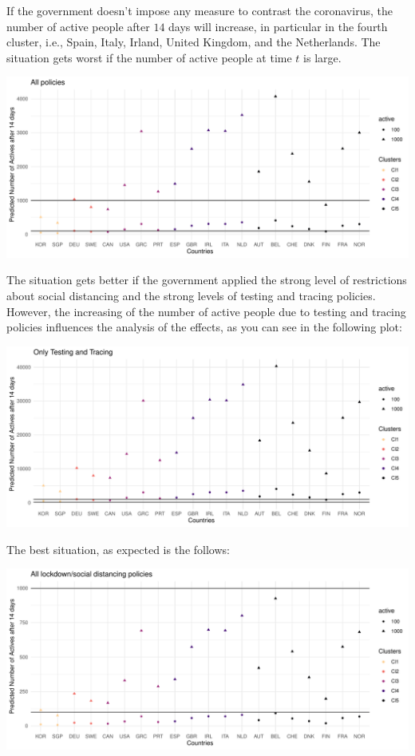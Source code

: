 \documentclass[
  6pt,
]{article}
\begin{document}
If the government doesn't impose any measure to contrast the
coronavirus, the number of active people after \(14\) days will
increase, in particular in the fourth cluster, i.e., Spain, Italy,
Irland, United Kingdom, and the Netherlands. The situation gets worst if
the number of active people at time \(t\) is large.

\begin{center}\includegraphics{Report_SC_Group3_files/figure-latex/unnamed-chunk-30-1} \end{center}

The situation gets better if the government applied the strong level of
restrictions about social distancing and the strong levels of testing
and tracing policies. However, the increasing of the number of active
people due to testing and tracing policies influences the analysis of
the effects, as you can see in the following plot:

\begin{center}\includegraphics{Report_SC_Group3_files/figure-latex/unnamed-chunk-31-1} \end{center}

The best situation, as expected is the follows:

\begin{center}\includegraphics{Report_SC_Group3_files/figure-latex/unnamed-chunk-32-1} \end{center}
\end{document}
